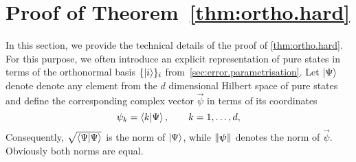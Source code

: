 \section{Proof of Theorem~\ref{thm:ortho.hard}}
\label{sec:error.ellpos}

In this section, we provide the technical details of the proof of \cref{thm:ortho.hard}.
For this purpose, we often introduce an explicit representation of pure states in terms of the orthonormal basis $\{\ket{i}\}_i$ from~\cref{sec:error.parametrisation}.
Let $\ket{\Psi}$ denote denote any element from the $d$ dimensional Hilbert space of pure states and define the corresponding  complex vector $\vec{\psi}$ in terms of its coordinates
\[
  \psi_{k} = \braket{k | \Psi} ,\qquad k=1,\ldots,d,\label{coordinates}
\]
Consequently, $\sqrt{\braket{\Psi | \Psi}}$ is the norm of $\ket{\Psi}$, while ${\Vert{\boldsymbol{\psi}}\Vert}$ denotes the norm of $\vec\psi$.
Obviously both norms are equal.

